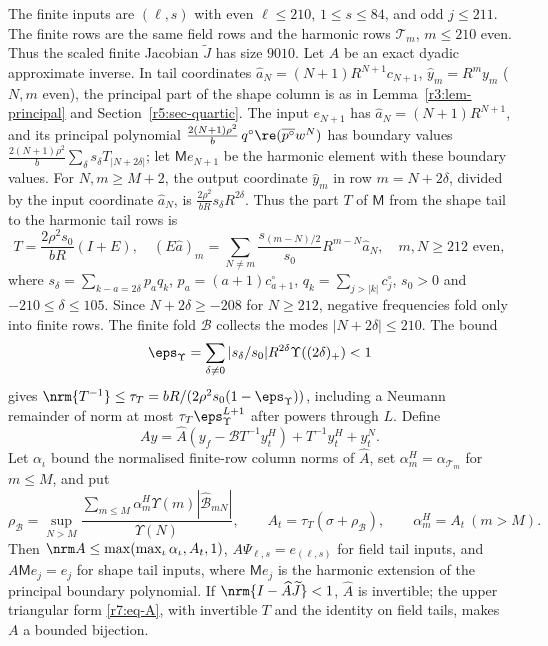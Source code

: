 The finite inputs are $(\ell,s)$ with even $\ell\leq210$, $1\leq s\leq84$, and odd $j\leq211$. The finite rows are the same field rows and the harmonic rows $\mathcal T_m$, $m\leq210$ even. Thus the scaled finite Jacobian $\widetilde J$ has size $9010$. Let $\widehat A$ be an exact dyadic approximate inverse. In tail coordinates $\hat a_N=(N+1)R^{N+1}c_{N+1}$, $\hat y_m=R^my_m$ ($N,m$ even), the principal part of the shape column is as in Lemma~\ref{r3:lem-principal} and Section~\ref{r5:sec-quartic}. The input $e_{N+1}$ has $\hat a_N=(N+1)R^{N+1}$, and its principal polynomial $\frac{2(N+1)\rho^2}b\,q^\circ\re(\overline{p^\circ}w^N)$ has boundary values $\frac{2(N+1)\rho^2}b\sum_\delta s_\delta T_{|N+2\delta|}$; let $\mathsf Me_{N+1}$ be the harmonic element with these boundary values. For $N,m\geq M+2$, the output coordinate $\hat y_m$ in row $m=N+2\delta$, divided by the input coordinate $\hat a_N$, is $\frac{2\rho^2}{bR}s_\delta R^{2\delta}$. Thus the part $T$ of $\mathsf M$ from the shape tail to the harmonic tail rows is
\[
T=\frac{2\rho^2s_0}{bR}(I+E),\quad
(E\hat a)_m=\sum_{N\ne m}\frac{s_{(m-N)/2}}{s_0}R^{m-N}\hat a_N,
\quad m,N\geq212\text{ even},
\]
where $s_\delta=\sum_{k-a=2\delta}p_aq_k$, $p_a=(a+1)c^\circ_{a+1}$, $q_k=\sum_{j>|k|}c^\circ_j$, $s_0>0$ and $-210\leq\delta\leq105$. Since $N+2\delta\geq-208$ for $N\geq212$, negative frequencies fold only into finite rows. The finite fold $\mathcal B$ collects the modes $|N+2\delta|\leq210$. The bound
\[
\eps_\Upsilon=\sum_{\delta\ne0}|s_\delta/s_0|R^{2\delta}\Upsilon((2\delta)_+)<1
\]
gives $\nrm{T^{-1}}\leq\tau_T=bR/(2\rho^2s_0(1-\eps_\Upsilon))$, including a Neumann remainder of norm at most $\tau_T\eps_\Upsilon^{L+1}$ after powers through $L$. Define
\begin{equation}\label{r7:eq-A}
Ay=\widehat A(y_f-\mathcal BT^{-1}y_t^H)+T^{-1}y_t^H+y_t^N.
\end{equation}
Let $\alpha_\iota$ bound the normalised finite-row column norms of $\widehat A$, set $\alpha^H_m=\alpha_{\mathcal T_m}$ for $m\leq M$, and put
\[
\rho_{\mathcal B}=\sup_{N>M}\frac{\sum_{m\leq M}\alpha^H_m\Upsilon(m)|\hat{\mathcal B}_{mN}|}{\Upsilon(N)},\qquad
A_t=\tau_T(\sigma+\rho_{\mathcal B}),\qquad\alpha^H_m=A_t\ (m>M).
\]
Then $\nrm A\leq\max(\max_\iota\alpha_\iota,A_t,1)$, $A\Psi_{\ell,s}=e_{(\ell,s)}$ for field tail inputs, and $A\mathsf Me_j=e_j$ for shape tail inputs, where $\mathsf Me_j$ is the harmonic extension of the principal boundary polynomial. If $\nrm{I-\widehat A\widetilde J}<1$, $\widehat A$ is invertible; the upper triangular form \eqref{r7:eq-A}, with invertible $T$ and the identity on field tails, makes $A$ a bounded bijection.


